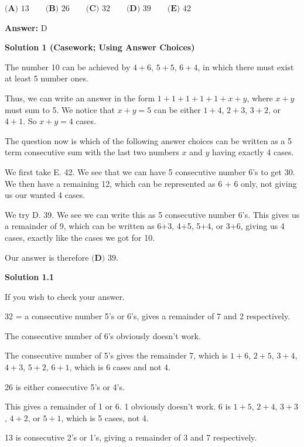 \begin{enumerate}
 $\textbf{(A) }13 \qquad \textbf{(B) }26 \qquad \textbf{(C) }32 \qquad \textbf{(D) }39 \qquad \textbf{(E) }42 \qquad$

 \textbf{Answer: }D



\textbf{Solution 1 (Casework; Using Answer Choices)}

The number 10 can be achieved by \( 4+6 \), \( 5+5 \), \( 6+4 \), in which there must exist at least 5 number ones. 

 Thus, we can write an answer in the form \( 1 + 1 + 1 + 1 + 1 + x + y \), where \( x + y \) must sum to 5. We notice that \( x + y = 5 \) can be either \( 1 + 4 \), \( 2 + 3 \), \( 3 + 2 \), or \( 4 + 1 \). So \( x + y = 4\) cases.

 The question now is which of the following answer choices can be written as a 5 term consecutive sum with the last two numbers \( x\) and \(y\) having exactly 4 cases.

 We first take E. 42. We see that we can have 5 consecutive number 6's to get 30. We then have a remaining 12, which can be represented as 6 + 6 only, not giving us our wanted 4 cases. 

 We try D. 39. We see we can write this as 5 consecutive number 6's. This gives us a remainder of 9, which can be written as 6+3, 4+5, 5+4, or 3+6, giving us 4 cases, exactly like the cases we got for 10.

 Our answer is therefore $\boxed{\textbf{(D)} \text{ 39}}$.

 



\textbf{Solution 1.1}

If you wish to check your answer.

 32 = a consecutive number 5's or 6's, gives a remainder of 7 and 2 respectively.

 The consecutive number of 6's obviously doesn't work.

 The consecutive number of 5's gives the remainder 7, which is \( 1+6 \), \( 2 + 5 \), \( 3+4 \), \( 4+3 \), \( 5+2 \), \( 6+1 \), which is 6 cases and not 4.

 26 is either consecutive 5's or 4's. 

 This gives a remainder of 1 or 6. 1 obviously doesn't work. 6 is \( 1+5 \), \( 2+4 \), \( 3+3 \), \( 4+2 \), or \( 5+1 \), which is 5 cases, not 4.

 13 is consecutive 2's or 1's, giving a remainder of 3 and 7 respectively. 


\end{enumerate}
